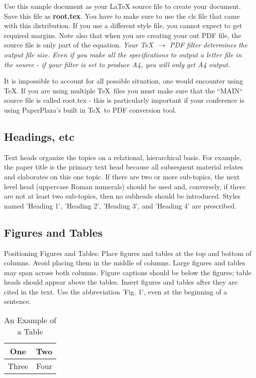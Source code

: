 \documentclass[letterpaper, 10 pt, conference]{ieeeconf}  %
\begin{document}
Use this sample document as your LaTeX source file to create your document. Save this file as {\bf root.tex}. You have to make sure to use the cls file that came with this distribution. If you use a different style file, you cannot expect to get required margins. Note also that when you are creating your out PDF file, the source file is only part of the equation. {\it Your \TeX\ $\rightarrow$ PDF filter determines the output file size. Even if you make all the specifications to output a letter file in the source - if your filter is set to produce A4, you will only get A4 output. }

It is impossible to account for all possible situation, one would encounter using \TeX. If you are using multiple \TeX\ files you must make sure that the ``MAIN`` source file is called root.tex - this is particularly important if your conference is using PaperPlaza's built in \TeX\ to PDF conversion tool.

\subsection{Headings, etc}

Text heads organize the topics on a relational, hierarchical basis. For example, the paper title is the primary text head because all subsequent material relates and elaborates on this one topic. If there are two or more sub-topics, the next level head (uppercase Roman numerals) should be used and, conversely, if there are not at least two sub-topics, then no subheads should be introduced. Styles named 'Heading 1', 'Heading 2', 'Heading 3', and 'Heading 4' are prescribed.

\subsection{Figures and Tables}

Positioning Figures and Tables: Place figures and tables at the top and bottom of columns. Avoid placing them in the middle of columns. Large figures and tables may span across both columns. Figure captions should be below the figures; table heads should appear above the tables. Insert figures and tables after they are cited in the text. Use the abbreviation 'Fig. 1', even at the beginning of a sentence.

\begin{table}[h]
\caption{An Example of a Table}
\label{table_example}
\begin{center}
\begin{tabular}{|c||c|}
\hline
One & Two\\
\hline
Three & Four\\
\hline
\end{tabular}
\end{center}
\end{table}
\end{document}
